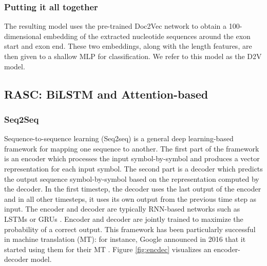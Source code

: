 \subsubsection{Putting it all together} \label{subsubsec:d2vinference}
The resulting model uses the pre-trained Doc2Vec network to obtain a 100-dimensional embedding of the extracted nucleotide sequences around the exon start and exon end. These two embeddings, along with the length features, are then given to a shallow MLP for classification. We refer to this model as the D2V model. 






\subsection{RASC: BiLSTM and Attention-based} \label{subsec:bilstm}

\subsubsection{Seq2Seq} \label{subsubsec:seq2seq}
Sequence-to-sequence learning (Seq2seq) \cite{seq2seq} is a general deep learning-based framework for mapping one sequence to another. The first part of the framework is an encoder which processes the input symbol-by-symbol and produces a vector representation for each input symbol. The second part is a decoder which predicts the output sequence symbol-by-symbol based on the representation computed by the decoder. In the first timestep, the decoder uses the last output of the encoder and in all other timesteps, it uses its own output from the previous time step as input. The encoder and decoder are typically RNN-based networks such as LSTMs \cite{lstm} or GRUs \cite{gru}. Encoder and decoder are jointly trained to maximize the probability of a correct output. This framework has been particularly successful in machine translation (MT): for instance, Google announced in 2016 that it started using them for their MT \cite{googlemt2016}. Figure \ref{fig:encdec} visualizes an encoder-decoder model.


